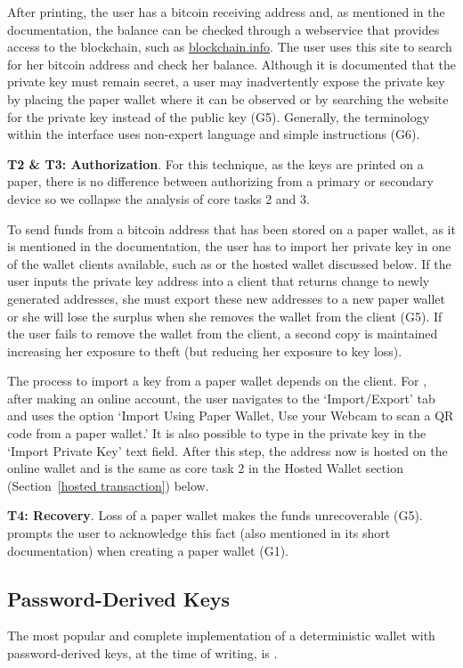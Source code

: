 After printing, the user has a bitcoin receiving address and, as mentioned in the documentation, the balance can be checked through a webservice that provides access to the blockchain, such as \url{blockchain.info}. The user uses this site to search for her bitcoin address and check her balance. Although it is documented that the private key must remain secret, a user may inadvertently expose the private key by placing the paper wallet where it can be observed or by searching the website for the private key instead of the public key (G5). Generally, the terminology within the \paper interface uses non-expert language and simple instructions (G6).

\textbf{T2 \& T3: Authorization}.
For this technique, as the keys are printed on a paper, there is no difference between authorizing from a primary or secondary device so we collapse the analysis of core tasks 2 and 3.
 
To send funds from a bitcoin address that has been stored on a paper wallet, as it is mentioned in the documentation, the user has to import her private key in one of the wallet clients available, such as \armory or the \block hosted wallet discussed below. If the user inputs the private key address into a client that returns change to newly generated addresses, she must export these new addresses to a new paper wallet or she will lose the surplus when she removes the wallet from the client (G5). If the user fails to remove the wallet from the client, a second copy is maintained increasing her exposure to theft (but reducing her exposure to key loss). 

The process to import a key from a paper wallet depends on the client. For \block, after making an online account, the user navigates to the `Import/Export' tab and uses the option `Import Using Paper Wallet, Use your Webcam to scan a QR code from a paper wallet.' It is also possible to type in the private key in the `Import Private Key' text field. After this step, the address now is hosted on the online wallet and is the same as core task 2 in the Hosted Wallet section (Section~\ref{hosted transaction}) below.

\textbf{T4: Recovery}.
Loss of a paper wallet makes the funds unrecoverable (G5). \paper prompts the user to acknowledge this fact (also mentioned in its short documentation) when creating a paper wallet (G1).

\subsection{Password-Derived Keys} The most popular and complete implementation of a deterministic wallet with password-derived keys, at the time of writing, is \brain.

